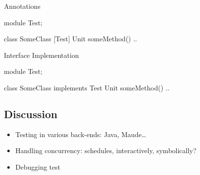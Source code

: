 \documentclass[a4paper,11pt,final]{article}
\begin{document}
\noindent Annotations
\begin{absexamplen}
module Test;

class SomeClass { 
  [Test] Unit someMethod() {
  	 ..
  }
}
\end{absexamplen}

\noindent Interface Implementation
\begin{absexamplen}
module Test;

class SomeClass implements Test { 
  Unit someMethod() {
  	 ..
  }
}
\end{absexamplen}

\subsection{Discussion}
\begin{itemize}
  \item Testing in various back-ends: Java, Maude\ldots
  \item Handling concurrency: schedules, interactively, symbolically?
  \item Debugging test
\end{itemize}
\end{document}
